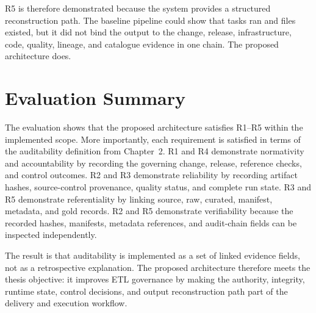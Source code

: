 R5 is therefore demonstrated because the system provides a structured
reconstruction path. The baseline pipeline could show that tasks ran and files
existed, but it did not bind the output to the change, release, infrastructure,
code, quality, lineage, and catalogue evidence in one chain. The proposed
architecture does.

\section{Evaluation Summary}
\noindent
The evaluation shows that the proposed architecture satisfies R1--R5 within
the implemented scope. More importantly, each requirement is satisfied in terms
of the auditability definition from Chapter~2. R1 and R4 demonstrate
normativity and accountability by recording the governing change, release,
reference checks, and control outcomes. R2 and R3 demonstrate reliability by
recording artifact hashes, source-control provenance, quality status, and
complete run state. R3 and R5 demonstrate referentiality by linking source,
raw, curated, manifest, metadata, and gold records. R2 and R5 demonstrate
verifiability because the recorded hashes, manifests, metadata references, and
audit-chain fields can be inspected independently.

The result is that auditability is implemented as a set of linked evidence
fields, not as a retrospective explanation. The proposed architecture therefore
meets the thesis objective: it improves ETL governance by making the authority,
integrity, runtime state, control decisions, and output reconstruction path
part of the delivery and execution workflow.
